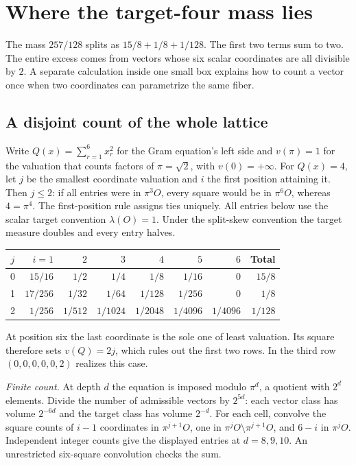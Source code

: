 \documentclass[12pt,letterpaper]{article}
\begin{document}
\section{Where the target-four mass lies}\label{sec:ledger}
The mass $257/128$ splits as $15/8+1/8+1/128$. The first two terms sum to two. The entire excess comes from vectors whose six scalar coordinates are all divisible by $2$. A separate calculation inside one small box explains how to count a vector once when two coordinates can parametrize the same fiber.

\subsection{A disjoint count of the whole lattice}
Write $Q(x)=\sum_{r=1}^6 x_r^2$ for the Gram equation's left side and $v(\pi)=1$ for the valuation that counts factors of $\pi=\sqrt2$, with $v(0)=+\infty$. For $Q(x)=4$, let $j$ be the smallest coordinate valuation and $i$ the first position attaining it. Then $j\le2$: if all entries were in $\pi^3 O$, every square would be in $\pi^6 O$, whereas $4=\pi^4$. The first-position rule assigns ties uniquely. All entries below use the scalar target convention $\lambda(O)=1$. Under the split-skew convention the target measure doubles and every entry halves.
\begin{center}\small
\begin{tabular}{@{}crrrrrrr@{}}\toprule
$j$ & $i=1$ & $2$ & $3$ & $4$ & $5$ & $6$ & Total\\\midrule
0 & $15/16$ & $1/2$ & $1/4$ & $1/8$ & $1/16$ & $0$ & $15/8$\\
1 & $17/256$ & $1/32$ & $1/64$ & $1/128$ & $1/256$ & $0$ & $1/8$\\
2 & $1/256$ & $1/512$ & $1/1024$ & $1/2048$ & $1/4096$ & $1/4096$ & $1/128$\\
\bottomrule\end{tabular}
\end{center}
At position six the last coordinate is the sole one of least valuation. Its square therefore sets $v(Q)=2j$, which rules out the first two rows. In the third row $(0,0,0,0,0,2)$ realizes this case.

\textit{Finite count.} At depth $d$ the equation is imposed modulo $\pi^d$, a quotient with $2^d$ elements. Divide the number of admissible vectors by $2^{5d}$: each vector class has volume $2^{-6d}$ and the target class has volume $2^{-d}$. For each cell, convolve the square counts of $i-1$ coordinates in $\pi^{j+1}O$, one in $\pi^jO\setminus\pi^{j+1}O$, and $6-i$ in $\pi^jO$. Independent integer counts give the displayed entries at $d=8,9,10$. An unrestricted six-square convolution checks the sum.
\end{document}
